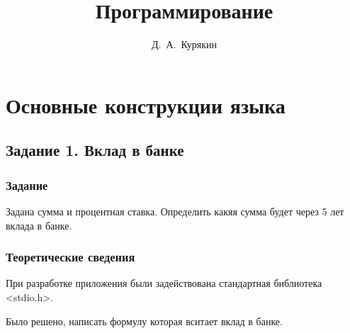 \documentclass[12pt,a4paper]{report}
\author{Д.~А.~Курякин}
\title{Программирование}
\begin{document}
\maketitle
\tableofcontents{}

\chapter{Основные конструкции языка}

\section{Задание 1. Вклад в банке}
\subsection{Задание}
\hspace{\parindent}
Задана сумма и процентная ставка. Определить какяя сумма будет через 5 лет вклада в банке. 
\subsection{Теоретические сведения}

\hspace{\parindent}
При разработке приложения были задействована стандартная библиотека <stdio.h>. 

\hspace{\parindent}
Было решено, написать формулу которая вситает вклад в банке.
\end{document}
